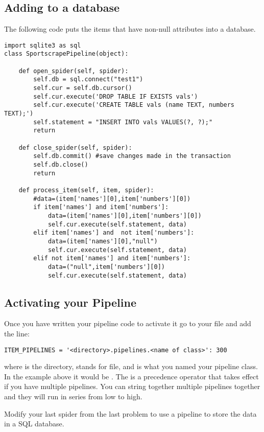 \subsection*{Adding to a database}
The following code puts the items that have non-null attributes into a database. 
\begin{lstlisting}
import sqlite3 as sql
class SportscrapePipeline(object):
    
    def open_spider(self, spider):
        self.db = sql.connect("test1")
        self.cur = self.db.cursor()
        self.cur.execute('DROP TABLE IF EXISTS vals')
        self.cur.execute('CREATE TABLE vals (name TEXT, numbers TEXT);')
        self.statement = "INSERT INTO vals VALUES(?, ?);"
        return

    def close_spider(self, spider):
        self.db.commit() #save changes made in the transaction
        self.db.close()
        return

    def process_item(self, item, spider):
        #data=(item['names'][0],item['numbers'][0])
        if item['names'] and item['numbers']:
            data=(item['names'][0],item['numbers'][0])
            self.cur.execute(self.statement, data)
        elif item['names'] and  not item['numbers']:
            data=(item['names'][0],"null")
            self.cur.execute(self.statement, data)
        elif not item['names'] and item['numbers']:
            data=("null",item['numbers'][0])
            self.cur.execute(self.statement, data)
\end{lstlisting}

\subsection*{Activating your Pipeline}
Once you have written your pipeline code to activate it go to your  file and add the line:
\begin{lstlisting}
ITEM_PIPELINES = '<directory>.pipelines.<name of class>': 300
\end{lstlisting}
where  is the directory,  stands for  file, and  is what you named your pipeline class.
In the example above it would be .
The  is a precedence operator that takes effect if you have multiple pipelines.
You can string together multiple pipelines together and they will run in series from low to high.

\begin{problem}
Modify your last spider from the last problem to use a pipeline to store the data in a SQL database.
\end{problem}

